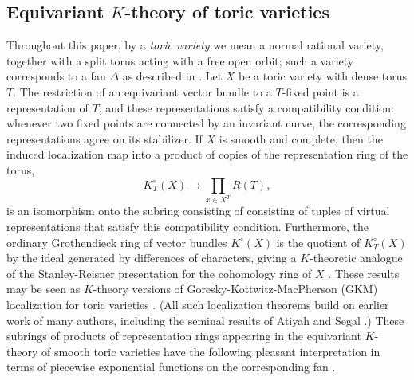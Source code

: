 \documentclass[11pt]{amsart}
\theoremstyle{definition}
\begin{document}
\subsection*{Equivariant $K$-theory of toric varieties}  Throughout this paper, by a {\em toric variety} we mean a normal rational variety, together with a split torus acting with a free open orbit; such a variety corresponds to a fan $\Delta$ as described in \cite{Fulton}.  Let $X$ be a toric variety with dense torus $T$.  The restriction of an equivariant vector bundle to a $T$-fixed point is a representation of $T$, and these representations satisfy a compatibility condition: whenever two fixed points are connected by an invariant curve, the corresponding representations agree on its stabilizer.  If $X$ is smooth and complete, then the induced localization map into a product of copies of the representation ring of the torus,
\[
  K^\circ_T(X) \rightarrow \prod_{x \in X^T} R(T),
\]
is an isomorphism onto the subring consisting of consisting of tuples of virtual representations that satisfy this compatibility condition.  Furthermore, the ordinary Grothendieck ring of vector bundles $K^\circ(X)$ is the quotient of $K^\circ_T(X)$ by the ideal generated by differences of characters, giving a $K$-theoretic analogue of the Stanley-Reisner presentation for the cohomology ring of $X$ \cite{vv}.  These results may be seen as $K$-theory versions of Goresky-Kottwitz-MacPherson (GKM) localization for toric varieties \cite{gkm, knutson-rosu}.  (All such localization theorems build on earlier work of many authors, including the seminal results of Atiyah and Segal \cite{atiyah-segal}.)  These subrings of products of representation rings appearing in the equivariant $K$-theory of smooth toric varieties have the following pleasant interpretation in terms of piecewise exponential functions on the corresponding fan \cite[Section~2.4]{bv}.  
\end{document}
